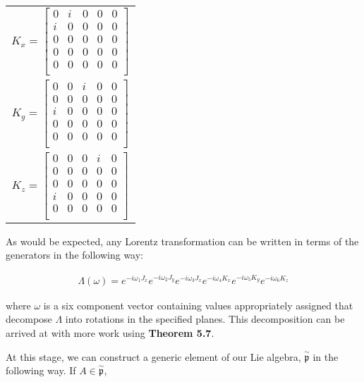 \documentclass[10pt]{ucthesis}
\begin{document}
\begin{center}
\begin{tabular}{c}
	$K_x = \begin{bmatrix}
				0 & i & 0 & 0 & 0 \\
				i & 0 & 0 & 0 & 0\\
				0 & 0 & 0 & 0 & 0\\
				0 & 0 & 0 & 0 & 0\\
				0 & 0 & 0 & 0 & 0\\
			\end{bmatrix}$ \\
	$K_y = \begin{bmatrix}
				0 & 0 & i & 0 & 0 \\
				0 & 0 & 0 & 0 & 0\\
				i & 0 & 0 & 0 & 0\\
				0 & 0 & 0 & 0 & 0\\
				0 & 0 & 0 & 0 & 0\\
			\end{bmatrix}$ \\
	$K_z = \begin{bmatrix}
				0 & 0 & 0 & i & 0 \\
				0 & 0 & 0 & 0 & 0\\
				0 & 0 & 0 & 0 & 0\\
				i & 0 & 0 & 0 & 0\\
				0 & 0 & 0 & 0 & 0\\
			\end{bmatrix}$ 
\end{tabular}
\end{center}

As would be expected, any Lorentz transformation can be written in terms of the generators in the following way:

\begin{equation}
\begin{aligned}
	\Lambda (\omega) = e^{-i\omega_1J_x}e^{-i\omega_2J_y}e^{-i\omega_3J_x}e^{-i\omega_4K_x}e^{-i\omega_5K_y}e^{-i\omega_6K_z}
\end{aligned}
\end{equation}

where $\omega$ is a six component vector containing values appropriately assigned that decompose $\Lambda$ into rotations in the specified planes. This decomposition can be arrived at with more work using \textbf{Theorem 5.7}. 

At this stage, we can construct a generic element of our Lie algebra, $\mathfrak{\overset{\sim}{p}}$ in the following way. If $A\in\mathfrak{\overset{\sim}{p}}$, 
\end{document}
